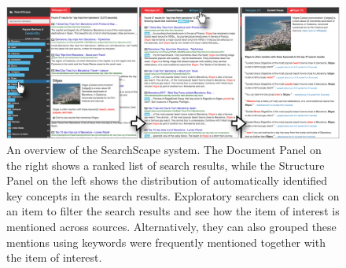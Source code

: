 


\begin{figure}
    \centering
    \includegraphics[width=1.0\textwidth]{Chapters/SearchScape/figures/main_old.png}
    \caption[An overview of the SearchScape system.]{An overview of the SearchScape system. The Document Panel on the right shows a ranked list of search results, while the Structure Panel on the left shows the distribution of automatically identified key concepts in the search results. Exploratory searchers can click on an item to filter the search results and see how the item of interest is mentioned across sources. Alternatively, they can also grouped these mentions using keywords were frequently mentioned together with the item of interest.}
    \label{fig:flow}
\end{figure}

